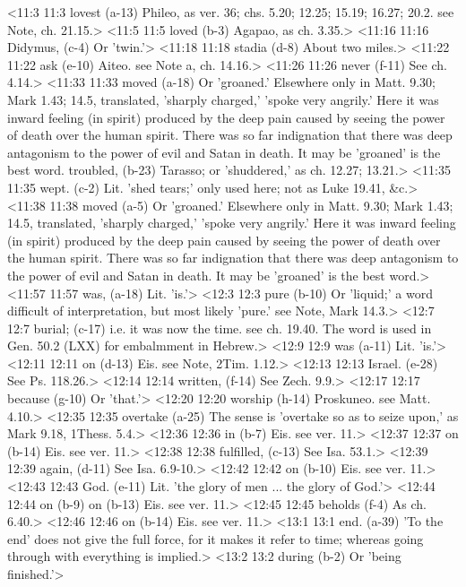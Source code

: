 <11:3 11:3  lovest (a-13)  Phileo, as ver. 36; chs. 5.20; 12.25; 15.19; 16.27; 20.2.  see Note, ch. 21.15.>
<11:5 11:5  loved (b-3)  Agapao, as ch. 3.35.>
<11:16 11:16  Didymus, (c-4)  Or 'twin.'>
<11:18 11:18  stadia (d-8)  About two miles.>
<11:22 11:22  ask (e-10)  Aiteo. see Note a, ch. 14.16.>
<11:26 11:26  never (f-11)  See ch. 4.14.>
<11:33 11:33  moved (a-18)  Or 'groaned.' Elsewhere only in Matt. 9.30; Mark 1.43; 14.5,  translated, 'sharply charged,' 'spoke very angrily.' Here it  was inward feeling (in spirit) produced by the deep pain caused  by seeing the power of death over the human spirit. There was  so far indignation that there was deep antagonism to the power  of evil and Satan in death. It may be 'groaned' is the best  word.
  troubled, (b-23)  Tarasso; or 'shuddered,' as ch. 12.27; 13.21.>
<11:35 11:35  wept. (c-2)  Lit. 'shed tears;' only used here; not as Luke 19.41, &c.>
<11:38 11:38  moved (a-5)  Or 'groaned.' Elsewhere only in Matt. 9.30; Mark 1.43; 14.5,  translated, 'sharply charged,' 'spoke very angrily.' Here it  was inward feeling (in spirit) produced by the deep pain caused  by seeing the power of death over the human spirit. There was  so far indignation that there was deep antagonism to the power  of evil and Satan in death. It may be 'groaned' is the best  word.>
<11:57 11:57  was, (a-18)  Lit. 'is.'>
<12:3 12:3  pure (b-10)  Or 'liquid;' a word difficult of interpretation, but most  likely 'pure.' see Note, Mark 14.3.>
<12:7 12:7  burial; (c-17)  i.e. it was now the time. see ch. 19.40. The word is used in  Gen. 50.2 (LXX) for embalmment in Hebrew.>
<12:9 12:9  was (a-11)  Lit. 'is.'>
<12:11 12:11  on (d-13)  Eis. see Note, 2Tim. 1.12.>
<12:13 12:13  Israel. (e-28)  See Ps. 118.26.>
<12:14 12:14  written, (f-14)  See Zech. 9.9.>
<12:17 12:17  because (g-10)  Or 'that.'>
<12:20 12:20  worship (h-14)  Proskuneo. see Matt. 4.10.>
<12:35 12:35  overtake (a-25)  The sense is 'overtake so as to seize upon,' as Mark 9.18,  1Thess. 5.4.>
<12:36 12:36  in (b-7)  Eis. see ver. 11.>
<12:37 12:37  on (b-14)  Eis. see ver. 11.>
<12:38 12:38  fulfilled, (c-13)  See Isa. 53.1.>
<12:39 12:39  again, (d-11)  See Isa. 6.9-10.>
<12:42 12:42  on (b-10)  Eis. see ver. 11.>
<12:43 12:43  God. (e-11)  Lit. 'the glory of men ... the glory of God.'>
<12:44 12:44  on (b-9)  on (b-13)
  Eis. see ver. 11.>
<12:45 12:45  beholds (f-4)  As ch. 6.40.>
<12:46 12:46  on (b-14)  Eis. see ver. 11.>
<13:1 13:1  end. (a-39)  'To the end' does not give the full force, for it makes it  refer to time; whereas going through with everything is implied.>
<13:2 13:2  during (b-2)  Or 'being finished.'>

